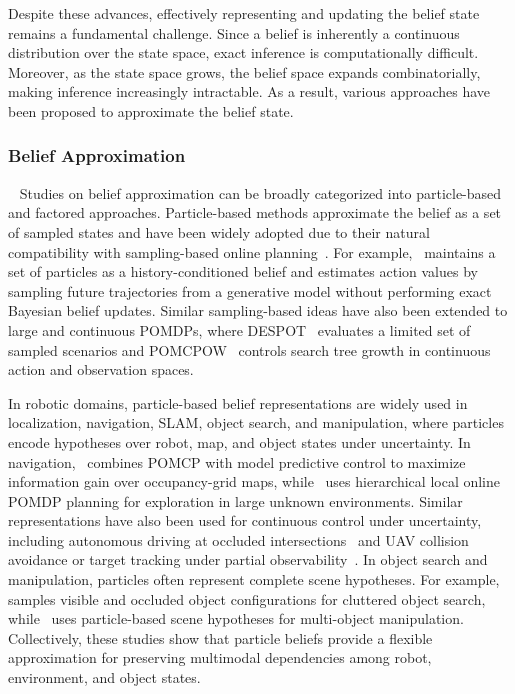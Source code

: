 Despite these advances, effectively representing and updating the belief state remains a fundamental challenge. Since a belief is inherently a continuous distribution over the state space, exact inference is computationally difficult. Moreover, as the state space grows, the belief space expands combinatorially, making inference increasingly intractable. As a result, various approaches have been proposed to approximate the belief state.


\subsubsection{Belief Approximation}~\label{rel:pu_belief_approx}
Studies on belief approximation can be broadly categorized into particle-based and factored approaches. Particle-based methods approximate the belief as a set of sampled states and have been widely adopted due to their natural compatibility with sampling-based online planning~\cite{doshi2005particle, lim2023optimality}. For example,~\cite{silver2010monte} maintains a set of particles as a history-conditioned belief and estimates action values by sampling future trajectories from a generative model without performing exact Bayesian belief updates. Similar sampling-based ideas have also been extended to large and continuous POMDPs, where DESPOT~\cite{somani2013despot} evaluates a limited set of sampled scenarios and POMCPOW~\cite{sunberg2018pomcpow} controls search tree growth in continuous action and observation spaces.



In robotic domains, particle-based belief representations are widely used in localization, navigation, SLAM, object search, and manipulation, where particles encode hypotheses over robot, map, and object states under uncertainty. In navigation,~\cite{lauri2016exploration} combines POMCP with model predictive control to maximize information gain over occupancy-grid maps, while~\cite{kim2021plgrim} uses hierarchical local online POMDP planning for exploration in large unknown environments. Similar representations have also been used for continuous control under uncertainty, including autonomous driving at occluded intersections~\cite{brechtel2014continuous} and UAV collision avoidance or target tracking under partial observability~\cite{bai2011uav,vanegas2016uav}. In object search and manipulation, particles often represent complete scene hypotheses. For example,~\cite{xiao2019objectsearch} samples visible and occluded object configurations for cluttered object search, while~\cite{pajarinen2017multiobject,pajarinen2022composition} uses particle-based scene hypotheses for multi-object manipulation. Collectively, these studies show that particle beliefs provide a flexible approximation for preserving multimodal dependencies among robot, environment, and object states.


